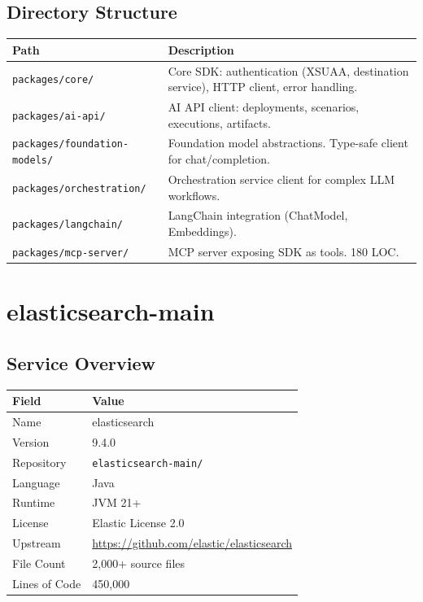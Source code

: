 \documentclass[11pt,a4paper]{article}
\begin{document}
\subsection{Directory Structure}

\begin{longtable}{@{}L{5cm}L{9cm}@{}}
\toprule
\textbf{Path} & \textbf{Description} \\
\midrule
\endhead
\texttt{packages/core/} & Core SDK: authentication (XSUAA, destination service), HTTP client, error handling. \\
\texttt{packages/ai-api/} & AI API client: deployments, scenarios, executions, artifacts. \\
\texttt{packages/foundation-models/} & Foundation model abstractions. Type-safe client for chat/completion. \\
\texttt{packages/orchestration/} & Orchestration service client for complex LLM workflows. \\
\texttt{packages/langchain/} & LangChain integration (ChatModel, Embeddings). \\
\texttt{packages/mcp-server/} & MCP server exposing SDK as tools. 180 LOC. \\
\bottomrule
\end{longtable}

\newpage

\section{elasticsearch-main}

\subsection{Service Overview}

\begin{tabular}{@{}L{4cm}L{10cm}@{}}
\toprule
\textbf{Field} & \textbf{Value} \\
\midrule
Name & elasticsearch \\
Version & 9.4.0 \\
Repository & \texttt{elasticsearch-main/} \\
Language & Java \\
Runtime & JVM 21+ \\
License & Elastic License 2.0 \\
Upstream & \url{https://github.com/elastic/elasticsearch} \\
File Count & 2,000+ source files \\
Lines of Code & 450,000 \\
\bottomrule
\end{tabular}
\end{document}
